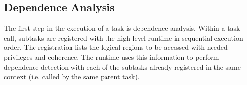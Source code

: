 \subsection{Dependence Analysis} 
\label{subsec:depanalysis}
The first step in the execution of a task is dependence analysis.  Within a task call, subtasks are
registered with the high-level runtime in sequential execution order.  The
registration lists the logical regions to be accessed with needed privileges and coherence.
The runtime uses this information to perform
dependence detection with each of the subtasks already registered
in the same context (i.e. called by the same parent task).  


